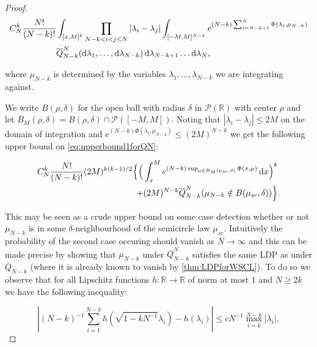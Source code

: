 \begin{proof}
	\begin{align}\label{eq:upperbound1forQN}
		C_N^k\frac{N!}{(N-k)!}&\int_{[x,M]^k}\prod_{N-k<i<j\leq N}|\lambda_i-\lambda_j| \int_{[-M,M]^{N-k}}e^{(N-k)\sum_{i=N-k+1}^N\Phi(\lambda_i,\mu_{N-k})}\nonumber\\
		&\overline Q_{N-k}^N(\mathop{}\!\mathrm{d}\lambda_1,\dots,\mathop{}\!\mathrm{d}\lambda_{N-k})\mathop{}\!\mathrm{d}\lambda_{N-k+1}\dots\mathop{}\!\mathrm{d}\lambda_N,
	\end{align}
	
	where $\mu_{N-k}$ is determined by the variables $\lambda_1,\dots,\lambda_{N-k}$ we are integrating against.
	
	We write $B(\rho,\delta)$ for the open ball with radius $\delta$ in $\mathcal P(\mathbb R)$ with center $\rho$ and let $B_M(\rho,\delta)=B(\rho,\delta)\cap\mathcal P([-M,M])$. Noting that $|\lambda_i-\lambda_j|\leq 2M$ on the domain of integration and $e^{(N-k)\Phi(\lambda_i,\mu_{N-k})}\leq (2M)^{N-k}$ we get the following upper bound on \ref{eq:upperbound1forQN}:
	
	\begin{align}\label{eq:upperbound2forQN}
		C_N^k\frac{N!}{(N-k)!}(2M)^{k(k-1)/2}\Big\{
			\Big(
				&\int_x^M e^{(N-k)\sup_{\mu\in B_M(\mu_{sc},\delta)}\Phi(x,\mu)}\mathop{}\!\mathrm{d} x
			\Big)^k \nonumber\\
			+&(2M)^{N-k}\overline Q_{N-k}^N(\mu_{N-k}\notin B(\mu_{sc},\delta))
		\Big\}.
	\end{align}
	
	This may be seen as a crude upper bound on some case detection whether or not $\mu_{N-k}$ is in some $\delta$-neighbourhood of the semicircle law $\mu_{sc}$. Intuitively the probability of the second case occuring should vanish as $N\rightarrow\infty$ and this can be made precise by showing that $\mu_{N-k}$ under $\overline Q_{N-k}^N$ satisfies the same LDP as under $\overline Q_{N-k}$ (where it is already known to vanish by \ref{thm:LDPforWSCL}). To do so we observe that for all Lipschitz functions $h:\mathbb R \rightarrow\mathbb R$ of norm at most $1$ and $N\geq 2k$ we have the following inequality:
	
	\begin{equation}\label{eq:lipschitzRescalingBoundedByEV}
		\left|(N-k)^{-1}\sum_{i=1}^{N-k}h\left(\sqrt{1-kN^{-1}}\lambda_i\right)-h(\lambda_i)\right|\leq cN^{-1}\max_{i=k}^{N-k}|\lambda_i|,
	\end{equation}


\end{proof}
